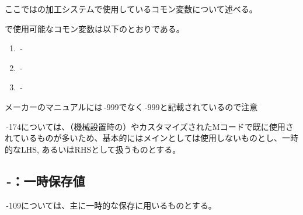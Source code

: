 

ここでは\DMC の加工システムで使用しているコモン変数について述べる。


\DMC で使用可能なコモン変数は以下のとおりである。
\begin{enumerate}[label=\sarrow]
\item {}\,-
\item {}\,-
\item {}\,-
\end{enumerate}
\begin{marker}
メーカーのマニュアルには\,-\ttNum999でなく\,-\ttNum999と記載されているので注意
\end{marker}



\,-\ttNum174については、（機械設置時の）\BundledNCPrg やカスタマイズされたMコードで既に使用されているものが多いため、基本的にはメインとしては使用しないものとし、一時的なLHS, あるいはRHSとして扱うものとする。


\subsection{\,-：一時保存値}
\noindent{}\,-\ttNum109については、主に一時的な保存に用いるものとする。\\

